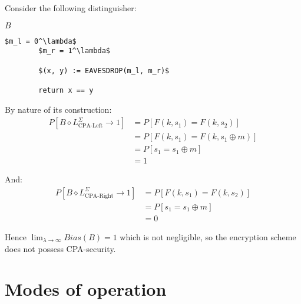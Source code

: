 \documentclass[a4paper]{scrreprt}
\begin{document}
Consider the following distinguisher:

\begin{library}{$B$}
	\begin{lstlisting}[mathescape=true,autogobble=true]
		$m_l = 0^\lambda$
		$m_r = 1^\lambda$

		$(x, y) := EAVESDROP(m_l, m_r)$

		return x == y
	\end{lstlisting}
\end{library}

By nature of its construction:
\begin{align*}
	P[B \diamond L^{\Sigma}_{\text{CPA-Left}} \rightarrow 1] & = P[F(k, s_1) = F(k, s_2)] \\
	& = P[F(k, s_1) = F(k, s_1 \oplus m)] \\
	& = P[s_1 = s_1 \oplus m] \tag*{As F is deterministic} \\
	& = 1\tag*{As $x \oplus 0^\lambda = x$ for all $\lambda$-bit strings $x$}
\end{align*}

And:
\begin{align*}
	P[B \diamond L^{\Sigma}_{\text{CPA-Right}} \rightarrow 1] & = P[F(k, s_1) = F(k, s_2)] \\
	& = P[s_1 = s_1 \oplus m] \tag*{As F is deterministic} \\
	& = 0 \tag*{As $x \oplus 1^\lambda \neq x$ for all $\lambda$-bit strings $x$}
\end{align*}

Hence $\lim_{\lambda \to \infty} Bias(B) = 1$ which is not negligible,
so the encryption scheme does not possess CPA-security.

\section{Modes of operation}
\end{document}
